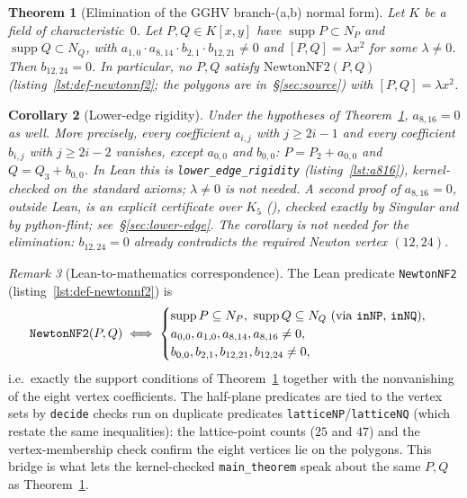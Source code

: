 \documentclass[a4paper,11pt]{article}
\newcommand{\filename}[1]{\texttt{\seqsplit{#1}}}
\theoremstyle{plain}
\newtheorem{theorem}{Theorem}[section]
\newtheorem{corollary}[theorem]{Corollary}
\theoremstyle{definition}
\theoremstyle{remark}
\newtheorem{remark}[theorem]{Remark}
\begin{document}
\begin{theorem}[Elimination of the GGHV branch-(a,b) normal form]\label{thm:main}
Let $K$ be a field of characteristic~$0$. Let $P,Q\in K[x,y]$ have
$\operatorname{supp}P\subset N_P$ and $\operatorname{supp}Q\subset N_Q$,
with $a_{1,0}\cdot a_{8,14}\cdot b_{2,1}\cdot b_{12,21}\neq0$ and
$[P,Q]=\lambda x^2$ for some $\lambda\neq0$. Then $b_{12,24}=0$.
In particular, no $P,Q$ satisfy $\mathrm{NewtonNF2}(P,Q)$
(listing~\ref{lst:def-newtonnf2}; the polygons are in~\S\ref{sec:source})
with $[P,Q]=\lambda x^2$.
\end{theorem}

\begin{corollary}[Lower-edge rigidity]\label{cor:a816}
Under the hypotheses of Theorem~\ref{thm:main}, $a_{8,16}=0$ as well. More precisely, every coefficient
$a_{i,j}$ with $j\geq 2i-1$ and every coefficient $b_{i,j}$ with $j\geq 2i-2$ vanishes, except $a_{0,0}$ and $b_{0,0}$:
$P=P_2+a_{0,0}$ and $Q=Q_3+b_{0,0}$.
In Lean this is \texttt{lower\_edge\_rigidity} (listing~\ref{lst:a816}), kernel-checked on the standard axioms;
$\lambda\neq0$ is not needed. A second proof of $a_{8,16}=0$, outside Lean, is an explicit certificate over $K_5$
(\filename{scripts/a816\_certificate/}), checked exactly by {\sc Singular} and by python-flint;
see~\S\ref{sec:lower-edge}. The corollary is not needed for the elimination: $b_{12,24}=0$
already contradicts the required Newton vertex $(12,24)$.
\end{corollary}

\begin{remark}[Lean-to-mathematics correspondence]\label{rem:nf2-bridge}
The Lean predicate \texttt{NewtonNF2} (listing~\ref{lst:def-newtonnf2}) is
\[
\texttt{NewtonNF2}(P,Q)\iff
\begin{cases}
\operatorname{supp}P\subseteq N_P,\ \operatorname{supp}Q\subseteq N_Q
\text{ (via \texttt{inNP}, \texttt{inNQ}),}\\
a_{0,0},a_{1,0},a_{8,14},a_{8,16}\neq0,\\
b_{0,0},b_{2,1},b_{12,21},b_{12,24}\neq0,
\end{cases}
\]
i.e.\ exactly the support conditions of Theorem~\ref{thm:main} together with the nonvanishing of the eight vertex coefficients. The half-plane predicates are tied to the vertex sets by \texttt{decide} checks run on duplicate predicates \texttt{latticeNP}/\texttt{latticeNQ} (which restate the same inequalities): the lattice-point counts ($25$ and $47$) and the vertex-membership check confirm the eight vertices lie on the polygons. This bridge is what lets the kernel-checked \texttt{main\_theorem} speak about the same $P,Q$ as Theorem~\ref{thm:main}.
\end{remark}
\end{document}
